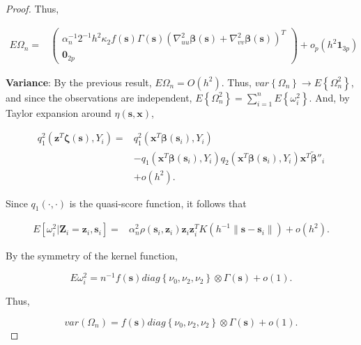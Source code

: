 \documentclass[authoryear,review, 12pt]{elsarticle}
\begin{document}
\begin{proof}
Thus,

\begin{align*}
E\Omega_{n}= & \left(\begin{array}{c}
\alpha_{n}^{-1}2^{-1}h^{2}\kappa_{2}f\left(\bm{s}\right)\Gamma\left(\bm{s}\right)\left(\nabla_{uu}^{2}\bm{\beta}\left(\bm{s}\right)+\nabla_{vv}^{2}\bm{\beta}\left(\bm{s}\right)\right)^{T}\\
\bm{0}_{2p}
\end{array}\right)+o_{p}\left(h^{2}\bm{1}_{3p}\right)
\end{align*}


\textbf{Variance}: By the previous result, $E\Omega_{n}=O\left(h^{2}\right)$.
Thus, $var\left\{ \Omega_{n}\right\} \to E\left\{ \Omega_{n}^{2}\right\} $,
and since the observations are independent, $E\left\{ \Omega_{n}^{2}\right\} =\sum_{i=1}^{n}E\left\{ \omega_{i}^{2}\right\} $.
And, by Taylor expansion around $\eta\left(\bm{s},\bm{x}\right)$, 

\begin{align*}
q_{1}^{2}\left(\bm{z}^{T}\bm{\zeta}\left(\bm{s}\right),Y_{i}\right)= & q_{1}^{2}\left(\bm{x}^{T}\bm{\beta}\left(\bm{s}_{i}\right),Y_{i}\right)\\
 & -q_{1}\left(\bm{x}^{T}\bm{\beta}\left(\bm{s}_{i}\right),Y_{i}\right)q_{2}\left(\bm{x}^{T}\bm{\beta}\left(\bm{s}_{i}\right),Y_{i}\right)\bm{x}^{T}\tilde{\bm{\beta}}''_{i}\\
 & +o\left(h^{2}\right).
\end{align*}


Since $q_{1}\left(\cdot,\cdot\right)$ is the quasi-score function,
it follows that 

\begin{align*}
E\left[\omega_{i}^{2}|\bm{Z}_{i}=\bm{z}_{i},\bm{s}_{i}\right]= & \alpha_{n}^{2}\rho\left(\bm{s}_{i},\bm{z}_{i}\right)\bm{z}_{i}\bm{z}_{i}^{T}K\left(h^{-1}\|\bm{s}-\bm{s}_{i}\|\right)+o\left(h^{2}\right).
\end{align*}


By the symmetry of the kernel function,

\[
E\omega_{i}^{2}=n^{-1}f\left(\bm{s}\right)diag\left\{ \nu_{0},\nu_{2},\nu_{2}\right\} \otimes\Gamma\left(\bm{s}\right)+o\left(1\right).
\]


Thus, 

\[
var\left(\Omega_{n}\right)=f\left(\bm{s}\right)diag\left\{ \nu_{0},\nu_{2},\nu_{2}\right\} \otimes\Gamma\left(\bm{s}\right)+o\left(1\right).
\]

\end{proof}
\end{document}
